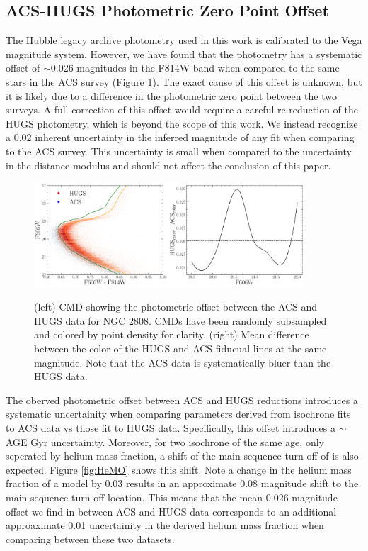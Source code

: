 \subsection{ACS-HUGS Photometric Zero Point Offset}
The Hubble legacy archive photometry used in this work is calibrated to the
Vega magnitude system. However, we have found that the photometry has a
systematic offset of $\sim0.026$ magnitudes in the F814W band when
compared to the same stars in the ACS survey (Figure \ref{fig:offset}). The
exact cause of this offset is unknown, but it is likely due to a difference in
the photometric zero point between the two surveys. A full correction of this
offset would require a careful re-reduction of the HUGS photometry, which is
beyond the scope of this work. We instead recognize a 0.02 inherent uncertainty
in the inferred magnitude of any fit when comparing to the ACS survey. This
uncertainty is small when compared to the uncertainty in the
distance modulus and should not affect the conclusion of this
paper. 

\begin{figure}
  \centering
  \includegraphics[width=0.90\textwidth]{src/figures/photometricOffset.pdf}
  \label{fig:offset}
  \caption{(left) CMD showing the photometric offset between the ACS and HUGS data for NGC 2808. CMDs have been randomly subsampled and colored by point density for clarity. (right) Mean difference between the color of the HUGS and ACS fiducual lines at the same magnitude. Note that the ACS data is systematically bluer than the HUGS data.}
\end{figure}

The oberved photometric offset between ACS and HUGS reductions introduces a
systematic uncertainity when comparing parameters derived from isochrone fits
to ACS data vs those fit to HUGS data. Specifically, this offset introduces a
{\color{red}$\sim$AGE Gyr} uncertainity. Moreover, for two isochrone of the
same age, only seperated by helium mass fraction, a shift of the main sequence
turn off of is also expected. Figure \ref{fig:HeMO} shows this shift. Note a change in the helium mass fraction of a model by 0.03 results in an approximate 0.08 magnitude shift to the main sequence turn off location. This means that the mean 0.026 magnitude offset we find in between ACS and HUGS data corresponds to an additional approaximate 0.01 uncertainity in the derived helium mass fraction when comparing between these two datasets. 

